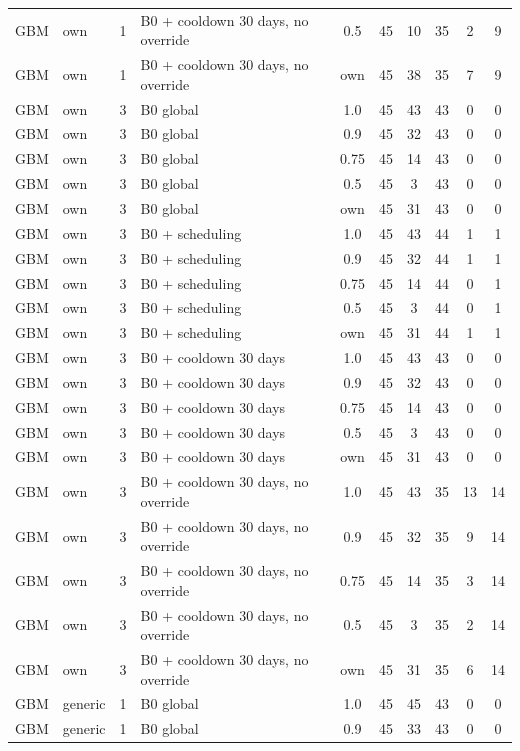 \begin{longtable}{lllp{4.4cm}cccccc}
GBM & own & 1 & B0 + cooldown 30 days, no override & 0.5 & 45 & 10 & 35 & 2 & 9 \\
GBM & own & 1 & B0 + cooldown 30 days, no override & own & 45 & 38 & 35 & 7 & 9 \\
GBM & own & 3 & B0 global & 1.0 & 45 & 43 & 43 & 0 & 0 \\
GBM & own & 3 & B0 global & 0.9 & 45 & 32 & 43 & 0 & 0 \\
GBM & own & 3 & B0 global & 0.75 & 45 & 14 & 43 & 0 & 0 \\
GBM & own & 3 & B0 global & 0.5 & 45 & 3 & 43 & 0 & 0 \\
GBM & own & 3 & B0 global & own & 45 & 31 & 43 & 0 & 0 \\
GBM & own & 3 & B0 + scheduling & 1.0 & 45 & 43 & 44 & 1 & 1 \\
GBM & own & 3 & B0 + scheduling & 0.9 & 45 & 32 & 44 & 1 & 1 \\
GBM & own & 3 & B0 + scheduling & 0.75 & 45 & 14 & 44 & 0 & 1 \\
GBM & own & 3 & B0 + scheduling & 0.5 & 45 & 3 & 44 & 0 & 1 \\
GBM & own & 3 & B0 + scheduling & own & 45 & 31 & 44 & 1 & 1 \\
GBM & own & 3 & B0 + cooldown 30 days & 1.0 & 45 & 43 & 43 & 0 & 0 \\
GBM & own & 3 & B0 + cooldown 30 days & 0.9 & 45 & 32 & 43 & 0 & 0 \\
GBM & own & 3 & B0 + cooldown 30 days & 0.75 & 45 & 14 & 43 & 0 & 0 \\
GBM & own & 3 & B0 + cooldown 30 days & 0.5 & 45 & 3 & 43 & 0 & 0 \\
GBM & own & 3 & B0 + cooldown 30 days & own & 45 & 31 & 43 & 0 & 0 \\
GBM & own & 3 & B0 + cooldown 30 days, no override & 1.0 & 45 & 43 & 35 & 13 & 14 \\
GBM & own & 3 & B0 + cooldown 30 days, no override & 0.9 & 45 & 32 & 35 & 9 & 14 \\
GBM & own & 3 & B0 + cooldown 30 days, no override & 0.75 & 45 & 14 & 35 & 3 & 14 \\
GBM & own & 3 & B0 + cooldown 30 days, no override & 0.5 & 45 & 3 & 35 & 2 & 14 \\
GBM & own & 3 & B0 + cooldown 30 days, no override & own & 45 & 31 & 35 & 6 & 14 \\
GBM & generic & 1 & B0 global & 1.0 & 45 & 45 & 43 & 0 & 0 \\
GBM & generic & 1 & B0 global & 0.9 & 45 & 33 & 43 & 0 & 0 \\

\end{longtable}
